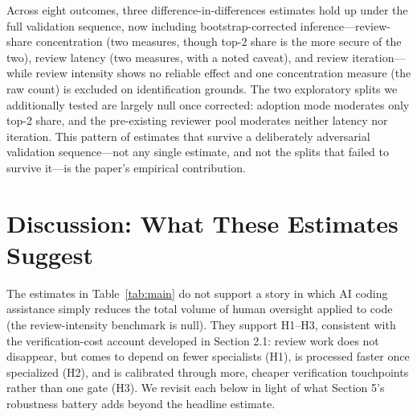 \documentclass[12pt]{article}
\begin{document}
Across eight outcomes, three difference-in-differences estimates hold up
under the full validation sequence, now including bootstrap-corrected
inference---review-share concentration (two measures, though top-2 share
is the more secure of the two), review latency (two measures, with a
noted caveat), and review iteration---while review intensity shows no
reliable effect and one concentration measure (the raw count) is excluded
on identification grounds. The two exploratory splits we additionally
tested are largely null once corrected: adoption mode moderates only
top-2 share, and the pre-existing reviewer pool moderates neither latency
nor iteration. This pattern of estimates that survive a deliberately
adversarial validation sequence---not any single estimate, and not the
splits that failed to survive it---is the paper's empirical contribution.

\section{Discussion: What These Estimates Suggest}

The estimates in Table~\ref{tab:main} do not support a story in which AI
coding assistance simply reduces the total volume of human oversight
applied to code (the review-intensity benchmark is null). They support
H1--H3, consistent with the verification-cost account developed in
Section 2.1: review work does not disappear, but comes to depend on
fewer specialists (H1), is processed faster once specialized (H2), and
is calibrated through more, cheaper verification touchpoints rather than
one gate (H3). We revisit each below in light of what Section 5's
robustness battery adds beyond the headline estimate.
\end{document}
